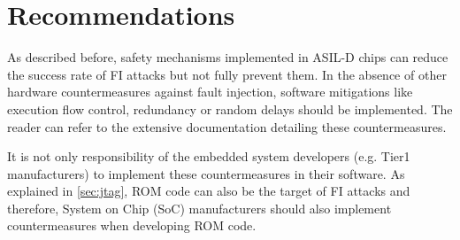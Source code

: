 \documentclass[a4paper, 10pt]{article}
\begin{document}
    
    

    
        



\section{Recommendations}

As described before, safety mechanisms implemented in ASIL-D chips can reduce the success rate of FI attacks but not fully prevent them. In the absence of other hardware countermeasures against fault injection, software mitigations like execution flow control, redundancy or random delays should be implemented. The reader can refer to the extensive documentation detailing these countermeasures.

It is not only responsibility of the embedded system developers (e.g. Tier1 manufacturers) to implement these countermeasures in their software. As explained in \autoref{sec:jtag}, ROM code can also be the target of FI attacks and therefore, System on Chip (SoC) manufacturers should also implement countermeasures when developing ROM code. 
\end{document}
